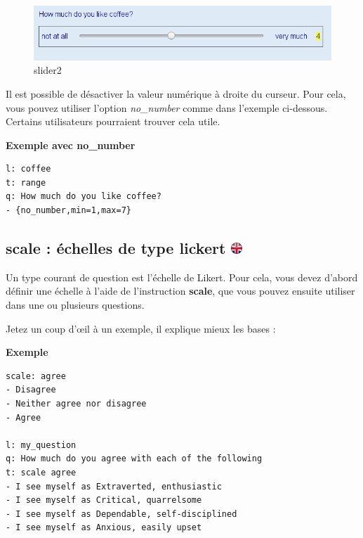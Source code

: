 \documentclass[
]{book}
\begin{document}
\begin{figure}
\centering
\includegraphics{img/slider2.png}
\caption{slider2}
\end{figure}

Il est possible de désactiver la valeur numérique à droite du curseur. Pour cela, vous pouvez utiliser l'option \emph{no\_number} comme dans l'exemple ci-dessous. Certains utilisateurs pourraient trouver cela utile.

\textbf{Exemple avec no\_number}

\begin{verbatim}
l: coffee
t: range
q: How much do you like coffee?
- {no_number,min=1,max=7}
\end{verbatim}

\hypertarget{scale-uxe9chelles-de-type-lickert}{%
\subsection[scale : échelles de type lickert ]{\texorpdfstring{scale : échelles de type lickert \href{https://www.psytoolkit.org/doc3.2.0/online-survey-syntax.html\#scales}{\protect\includegraphics{img/ukflag.png}}}{scale : échelles de type lickert }}\label{scale-uxe9chelles-de-type-lickert}}

Un type courant de question est l'échelle de Likert. Pour cela, vous devez d'abord définir une échelle à l'aide de l'instruction \textbf{scale}, que vous pouvez ensuite utiliser dans une ou plusieurs questions.

Jetez un coup d'œil à un exemple, il explique mieux les bases :

\textbf{Exemple}

\begin{verbatim}
scale: agree
- Disagree
- Neither agree nor disagree
- Agree

l: my_question
q: How much do you agree with each of the following
t: scale agree
- I see myself as Extraverted, enthusiastic
- I see myself as Critical, quarrelsome
- I see myself as Dependable, self-disciplined
- I see myself as Anxious, easily upset
\end{verbatim}
\end{document}

